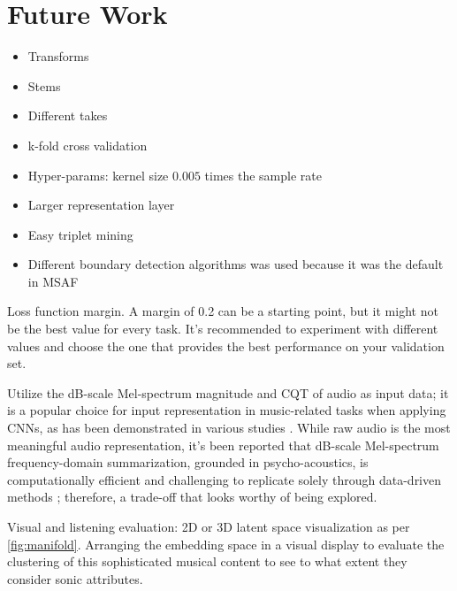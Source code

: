\chapter{Future Work}

\begin{itemize}
  \item Transforms
  \item Stems
  \item Different takes
  \item k-fold cross validation
  \item Hyper-params: kernel size $0.005$ times the sample rate
  \item Larger representation layer
  \item Easy triplet mining \cite{XuanImprovedMining}
  \item Different boundary detection algorithms \cite{sf} was used because it was the default in MSAF \cite{MSAF}
\end{itemize}

Loss function margin. A margin of 0.2 can be a starting point, but it might not be the best value for every task. It's recommended to experiment with different values and choose the one that provides the best performance on your validation set.

Utilize the dB-scale Mel-spectrum magnitude and CQT of audio as input data; it is a popular choice for input representation in music-related tasks when applying CNNs, as has been demonstrated in various studies \cite{Kim2020OneStrategies}. While raw audio is the most meaningful audio representation, it's been reported that dB-scale Mel-spectrum frequency-domain summarization, grounded in psycho-acoustics, is computationally efficient and challenging to replicate solely through data-driven methods \cite{Kim2020OneStrategies}; therefore, a trade-off that looks worthy of being explored.

Visual and listening evaluation: 2D or 3D latent space visualization as per \ref{fig:manifold}. Arranging the embedding space in a visual display to evaluate the clustering of this sophisticated musical content to see to what extent they consider sonic attributes. 



\newpage